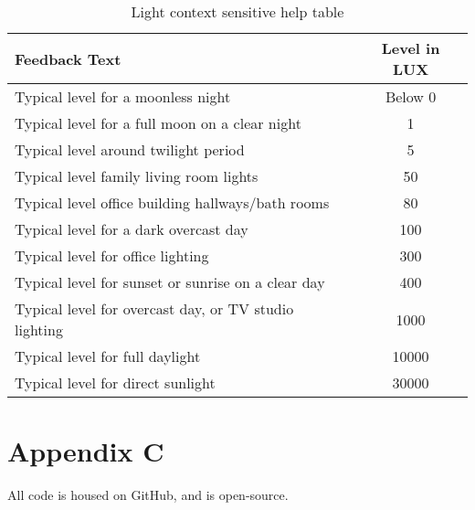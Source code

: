 \documentclass{article}
\begin{document}
\begin{table}[H]
\def\arraystretch{2}%
\begin{center}
 \begin{tabular}{|| L{8cm} | c ||} 
 \hline
 \textbf{Feedback Text} & \textbf{Level in LUX}  \\ [0.5ex] 
 \hline\hline
 Typical level for a moonless night & Below 0 \\ 
 \hline
 Typical level for a full moon on a clear night & 1 \\
 \hline
 Typical level around twilight period & 5 \\
 \hline
 Typical level family living room lights & 50 \\ [1ex] 
 \hline
 Typical level office building hallways/bath rooms & 80 \\ [1ex] 
 \hline
 Typical level for a dark overcast day & 100 \\ [1ex] 
 \hline
 Typical level for office lighting & 300 \\ [1ex] 
 \hline
 Typical level for sunset or sunrise on a clear day & 400 \\ [1ex] 
 \hline
 Typical level for overcast day, or TV studio lighting & 1000 \\ [1ex] 
 \hline
 Typical level for full daylight & 10000 \\ [1ex] 
 \hline
 Typical level for direct sunlight & 30000 \\ [1ex] 
 \hline
\end{tabular}
\end{center}
\caption{Light context sensitive help table}
\label{table:testing_op_timings}
\end{table}

\newpage
\section{Appendix C}
\label{sec:appendix_C}
All code is housed on GitHub, and is open-source. 
\end{document}
